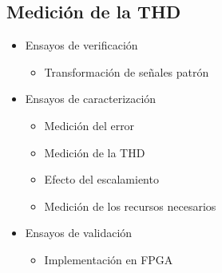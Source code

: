 \subsection{Medición de la THD}

\begin{frame}{}
  \begin{itemize}
    \item<1-> Ensayos de verificación
    \begin{itemize}
      \Fontitit
      \item<1-> Transformación de señales patrón
    \end{itemize}
    \item<1-> Ensayos de caracterización
    \begin{itemize}
      \Fontitit
      \item<1-> Medición del error
      \item<1-> Medición de la THD
      \item<1-> Efecto del escalamiento
      \item<1-> Medición de los recursos necesarios 
    \end{itemize}
    \item<1-> Ensayos de validación
    \begin{itemize}
      \Fontitit
      \item<1-> Implementación en FPGA
    \end{itemize}
  \end{itemize}
\end{frame}

